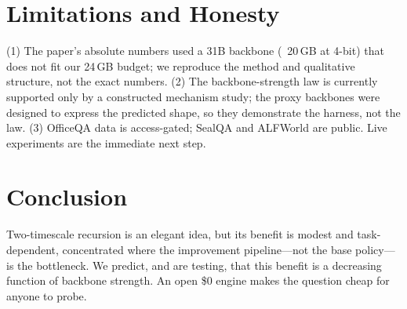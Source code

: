 \documentclass[11pt]{article}
\begin{document}
\section{Limitations and Honesty}
(1) The paper's absolute numbers used a 31B backbone (~20\,GB at 4-bit) that does
not fit our 24\,GB budget; we reproduce the method and qualitative structure, not
the exact numbers. (2) The backbone-strength law is currently supported only by a
constructed mechanism study; the proxy backbones were designed to express the
predicted shape, so they demonstrate the harness, not the law. (3) OfficeQA data is
access-gated; SealQA and ALFWorld are public. Live experiments are the immediate
next step.

\section{Conclusion}
Two-timescale recursion is an elegant idea, but its benefit is modest and
task-dependent, concentrated where the improvement pipeline---not the base
policy---is the bottleneck. We predict, and are testing, that this benefit is a
decreasing function of backbone strength. An open \$0 engine makes the question
cheap for anyone to probe.



\end{document}

